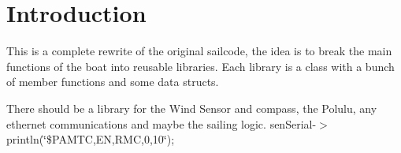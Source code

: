 \hypertarget{index_intro}{}\section{\-Introduction}\label{index_intro}
\-This is a complete rewrite of the original sailcode, the idea is to break the main functions of the boat into reusable libraries. \-Each library is a class with a bunch of member functions and some data structs.

\-There should be a library for the \-Wind \-Sensor and compass, the \-Polulu, any ethernet communications and maybe the sailing logic. sen\-Serial-\/$>$println(\char`\"{}\$\-P\-A\-M\-T\-C,\-E\-N,\-R\-M\-C,0,10\char`\"{}); 
